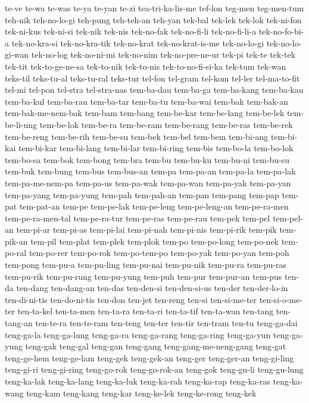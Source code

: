 {te-ve te-wa te-was te-ya te-yan te-zi tea-tri-ka-lis-me tef-lon teg-men
teg-men-tum teh-nik teh-no-lo-gi teh-pung teh-teh-an teh-yan tek-bal
tek-lek tek-lok tek-ni-fon tek-ni-kus tek-ni-si tek-nik tek-nis tek-no-fak
tek-no-fi-li tek-no-fi-li-a tek-no-fo-bi-a tek-no-kra-si tek-no-kra-tik
tek-no-krat tek-no-krat-is-me tek-no-lo-gi tek-no-lo-gi-wan tek-no-log
tek-no-ni-mi tek-no-nim tek-no-pre-ne-ur tek-pi tek-te tek-tek tek-tit
tek-to-ge-ne-sa tek-to-nik tek-to-nis tek-to-no-fi-si-ka tek-tum tek-wan
teks-til teks-tu-al teks-tu-ral teks-tur tel-fon tel-gram tel-kom tel-ler
tel-ma-to-fit tel-mi tel-pon tel-stra tel-stra-nas tem-ba-dau tem-ba-ga
tem-ba-kang tem-ba-kau tem-ba-kul tem-ba-rau tem-ba-tar tem-ba-tu
tem-ba-wai tem-bak tem-bak-an tem-bak-me-nem-bak tem-bam tem-bang
tem-be-kar tem-be-lang tem-be-lek tem-be-li-ung tem-be-lok tem-be-ra
tem-be-ram tem-be-rang tem-be-ras tem-be-rek tem-be-reng tem-be-rih
tem-be-su tem-bek tem-bel tem-bem tem-bi-ang tem-bi-kai tem-bi-kar
tem-bi-lang tem-bi-lar tem-bi-ring tem-bis tem-bo-la tem-bo-lok tem-bo-sa
tem-bok tem-bong tem-bra tem-bu tem-bu-ku tem-bu-ni tem-bu-su tem-buk
tem-bung tem-bus tem-bus-an tem-pa tem-pa-an tem-pa-la tem-pa-lak
tem-pa-me-nem-pa tem-pa-us tem-pa-wak tem-pa-wan tem-pa-yak tem-pa-yan
tem-pa-yang tem-pa-yung tem-pah tem-pah-an tem-pan tem-pang tem-pap
tem-pat tem-pat-an tem-pe tem-pe-lak tem-pe-leng tem-pe-leng-an
tem-pe-ra-men tem-pe-ra-men-tal tem-pe-ra-tur tem-pe-ras tem-pe-rau
tem-pek tem-pel tem-pel-an tem-pi-ar tem-pi-as tem-pi-lai tem-pi-nah
tem-pi-nis tem-pi-rik tem-pik tem-pik-an tem-pil tem-plat tem-plek
tem-plok tem-po tem-po-long tem-po-nek tem-po-ral tem-po-rer tem-po-rok
tem-po-tem-po tem-po-yak tem-po-yan tem-poh tem-pong tem-pu-a tem-pu-ling
tem-pu-nai tem-pu-nik tem-pu-ra tem-pu-ras tem-pu-rik tem-pu-rung
tem-pu-yung tem-puh tem-pur tem-pur-an tem-pus ten-da ten-dang ten-dang-an
ten-das ten-den-si ten-den-si-us ten-der ten-der-lo-in ten-di-ni-tis
ten-do-ni-tis ten-don ten-jet ten-reng ten-si ten-si-me-ter
ten-si-o-me-ter ten-ta-kel ten-ta-men ten-ta-ra ten-ta-ri ten-ta-tif
ten-ta-wan ten-tang ten-tang-an ten-te-ra ten-te-ram ten-teng ten-ter
ten-tir ten-tram ten-tu teng-ga-dai teng-ga-la teng-ga-lung teng-ga-ra
teng-ga-rang teng-ga-ring teng-ga-yun teng-ga-yung teng-gak teng-gal
teng-gan teng-gang teng-gang-me-neng-gang teng-gat teng-ge-hem teng-ge-lam
teng-gek teng-gek-an teng-ger teng-ger-an teng-gi-ling teng-gi-ri
teng-gi-ring teng-go-rok teng-go-rok-an teng-gok teng-gu-li teng-gu-lung
teng-ka-lak teng-ka-lang teng-ka-luk teng-ka-rah teng-ka-rap teng-ka-ras
teng-ka-wang teng-kam teng-kang teng-kar teng-ke-lek teng-ke-rong teng-kek
}
